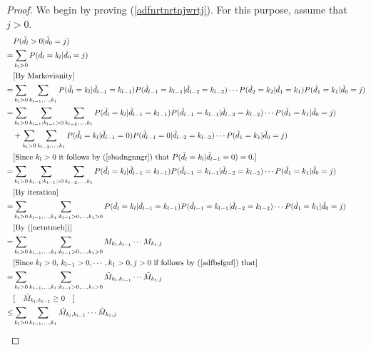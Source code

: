 \documentclass[a4paper,aps,floatfix]{revtex4}
\begin{document}
\begin{proof}
We begin by proving (\ref{adfnrtnrtnjwrtj}). For this purpose, assume that $j>0$. 
\begin{equation}
\begin{split}
 &P(\tilde{d}_l >0 |\tilde{d}_0 = j)\\
 = & \sum_{k_l>0}P(\tilde{d}_l =k_l |\tilde{d}_0 = j)\\
& [\textrm{By Markovianity}]\\
= & \sum_{k_l>0}\sum_{k_{l-1},\ldots,k_1} P(\tilde{d}_l = k_l|\tilde{d}_{l-1} = k_{l-1})P(\tilde{d}_{l-1} = k_{l-1}|\tilde{d}_{l-2} = k_{l-2})\cdots P(\tilde{d}_2 = k_2|\tilde{d}_1 = k_1)P(\tilde{d}_1 = k_1|\tilde{d}_0 = j)\\
%
= & \sum_{k_l>0}\sum_{k_{l-1}:k_{l-1}>0}\sum_{k_{l-2},\ldots,k_1} P(\tilde{d}_l = k_l |\tilde{d}_{l-1} = k_{l-1})P(\tilde{d}_{l-1} = k_{l-1}|\tilde{d}_{l-2} = k_{l-2})\cdots  P(\tilde{d}_1 = k_1|\tilde{d}_0 = j)\\
& + \sum_{k_l>0}\sum_{k_{l-2},\ldots,k_1} P(\tilde{d}_l = k_l|\tilde{d}_{l-1} = 0)P(\tilde{d}_{l-1} = 0|\tilde{d}_{l-2} = k_{l-2})\cdots P(\tilde{d}_1 = k_1|\tilde{d}_0 = j)\\
%
& [\textrm{Since $k_l> 0$ it follows by (\ref{sbadngnngr}) that $P(\tilde{d}_l = k_l|\tilde{d}_{l-1} = 0) = 0$.}]\\
= & \sum_{k_l>0}\sum_{k_{l-1}:k_{l-1}>0}\sum_{k_{l-2},\ldots,k_1} P(\tilde{d}_l = k_l |\tilde{d}_{l-1} = k_{l-1})P(\tilde{d}_{l-1} = k_{l-1}|\tilde{d}_{l-2} = k_{l-2})\cdots P(\tilde{d}_1 = k_1|\tilde{d}_0 = j)\\
& [\textrm{By iteration}]\\
= & \sum_{k_l>0}\sum_{k_{l-1},\ldots,k_1:k_{l-1} >0,\ldots, k_1 >0} P(\tilde{d}_l = k_l |\tilde{d}_{l-1} = k_{l-1})P(\tilde{d}_{l-1} = k_{l-1}|\tilde{d}_{l-2} = k_{l-2})\cdots  P(\tilde{d}_1 = k_1|\tilde{d}_0 = j)\\
& [\textrm{By (\ref{netntmeh})}]\\
= & \sum_{k_l>0} \sum_{k_{l-1},\ldots,k_1:k_{l-1} >0,\ldots, k_1 >0} M_{k_l,k_{l-1}}\cdots M_{k_1,j}\\
& [\textrm{Since $k_l > 0,\, k_{l-1}>0,\cdots, k_{1}>0, j>0$ if follows by (\ref{adfbsfgnf}) that}] \\
= &  \sum_{k_l>0} \sum_{k_{l-1},\ldots,k_1:k_{l-1} >0,\ldots, k_1 >0} \tilde{M}_{k_l,k_{l-1}}\cdots \tilde{M}_{k_1,j}\\
& [\quad \tilde{M}_{k_l,k_{l-1}}\geq 0  \quad]\\
\leq  &  \sum_{k_l>0}  \sum_{k_{l-1},\ldots, k_{1}}\tilde{M}_{k_l,k_{l-1}}\cdots \tilde{M}_{k_1,j}\\

\end{split}
\end{equation}
\end{proof}
\end{document}
